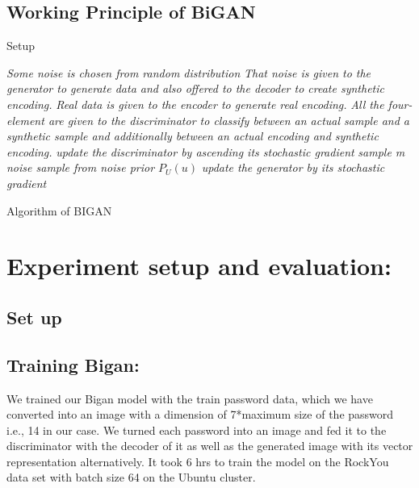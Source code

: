 \documentclass[runningheads]{llncs}
\begin{document}
\subsection{Working Principle of BiGAN}
\begin{algorithm*}[H]
\caption{Setup}
\label{algo:pre}
\begin{algorithmic}[1]
    
            \STATE \emph{Some noise is chosen from random distribution}
            \STATE \emph{That noise is given to the generator to generate data
 and also offered to the decoder to create synthetic encoding.}
            \STATE \emph{Real data is given to the encoder to generate real encoding.}
            \STATE \emph{All the four-element are given to the discriminator to classify between an actual sample and a synthetic sample and additionally between an actual encoding and synthetic encoding.
 }
            \STATE \emph{update the discriminator by ascending its stochastic gradient}
        \ENDFOR
        \STATE \emph{sample m noise sample from noise prior ${P_U(u)}$}
        \STATE \emph{update the generator by its stochastic gradient}
    \ENDFOR
    
 \caption{Algorithm of BIGAN}    
\end{algorithmic}
\end{algorithm*}
\section{Experiment setup and evaluation:}
\subsection{Set up}

\subsection{Training Bigan:}
We trained our Bigan model with the train password data, which we have converted into an image with a dimension of 7*maximum size of the password i.e., 14 in our case. We turned each password into an image and fed it to the discriminator with the decoder of it as well as the generated image with its vector representation alternatively.
It took 6 hrs to train the model on the RockYou data set with batch size 64 on the Ubuntu cluster. 
\end{document}

